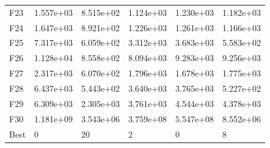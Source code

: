 \begin{tabular}{llllll}
F23  &  1.557e+03 &  8.515e+02 &  1.124e+03 &  1.230e+03 &  1.182e+03 \\
F24  &  1.647e+03 &  8.921e+02 &  1.226e+03 &  1.261e+03 &  1.166e+03 \\
F25  &  7.317e+03 &  6.059e+02 &  3.312e+03 &  3.683e+03 &  5.583e+02 \\
F26  &  1.128e+04 &  8.558e+02 &  8.094e+03 &  9.283e+03 &  9.256e+03 \\
F27  &  2.317e+03 &  6.070e+02 &  1.796e+03 &  1.678e+03 &  1.775e+03 \\
F28  &  6.437e+03 &  5.443e+02 &  3.640e+03 &  3.765e+03 &  5.227e+02 \\
F29  &  6.309e+03 &  2.305e+03 &  3.761e+03 &  4.544e+03 &  4.378e+03 \\
F30  &  1.181e+09 &  3.543e+06 &  3.759e+08 &  5.547e+08 &  8.552e+06 \\
Best &          0 &         20 &          2 &          0 &          8 \\
\bottomrule
\end{tabular}
